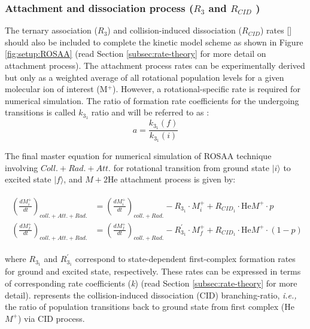 \subsubsection{Attachment and dissociation process (\texorpdfstring{$R_3$ }{} and \texorpdfstring{$R_{CID}$}{} )}
\label{subsec:ROSAA-simulation-att}

The ternary association ($R_3$) and collision-induced dissociation ($R_{CID}$) rates [\pers] should also be included to complete the kinetic model scheme as shown in Figure \ref{fig:setup:ROSAA} (read Section \ref{subsec:rate-theory} for more detail on attachment process). The attachment process rates can be experimentally derived but only as a weighted average of all rotational population levels for a given molecular ion of interest (M$^+$). However, a rotational-specific rate is required for numerical simulation. The ratio of formation rate coefficients for the undergoing transitions is called $k_{3_1}$ ratio and will be referred to as :
\begin{equation}
    a = \frac{k_{3_1}(f)}{k_{3_1}(i)}
    \label{eqn:k3_ratio}
\end{equation}

The final master equation for numerical simulation of ROSAA technique involving $Coll. + Rad. + Att.$ for rotational transition from ground state $|i\rangle$ to excited state $|f\rangle$, and $M+ 2\text{He} $ attachment process is given by:

\begin{align*}
    \begin{split}
        \left( \frac{dM^+_{i}}{dt} \right) _{coll. + Att.+ Rad.} 
        & = \left( \frac{dM^+_{i}}{dt} \right) _{coll. +  Rad.}
    -R_{3_1} \cdot M^+_{i} + R_{CID_1} \cdot \text{He}M^+ \cdot p
    \\
    \left( \frac{dM^+_{f}}{dt} \right) _{coll. + Att.+ Rad.} 
    &= \left( \frac{dM^+_{f}}{dt} \right) _{coll. +Rad.}
    -R^{'}_{3_1} \cdot M^+_{f} + R_{CID_1} \cdot \text{He}M^+ \cdot (1-p)
    \end{split}
\end{align*}

where $R_{3_1}$ and $R^{'}_{3_1}$ correspond to state-dependent first-complex formation rates for ground and excited state, respectively. These rates can be expressed in terms of corresponding rate coefficients (\emph{k}) (read Section \ref{subsec:rate-theory} for more detail).  represents the collision-induced dissociation (CID) branching-ratio, \emph{i.e.,} the ratio of population transitions back to ground state from first complex (He$M^+$) via CID process.\\


